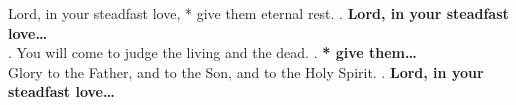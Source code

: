 Lord, in your steadfast love, * give them eternal rest. \Rbar. \textbf{Lord, in your steadfast love\dots}\\
\Vbar. You will come to judge the living and the dead. \Rbar. \textbf{* give them\dots}\\
Glory to the Father, and to the Son, and to the Holy Spirit. \Rbar. \textbf{Lord, in your steadfast love\dots}\\
